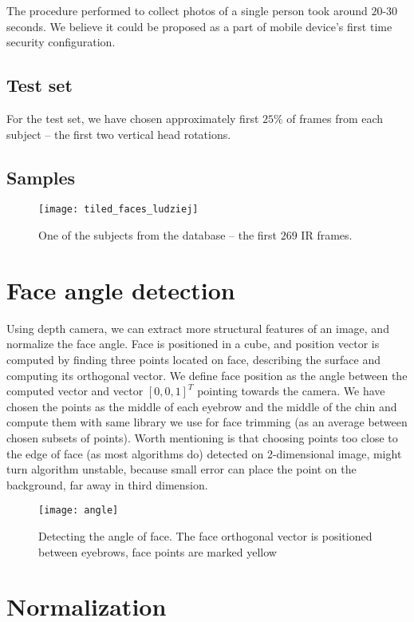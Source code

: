     The procedure performed to collect photos of a single person took around $20$-$30$ seconds.
    We believe it could be proposed as a part of mobile device's first time security configuration.

    \subsection*{Test set}
    For the test set, we have chosen approximately first $25\%$ of
    frames from each subject -- the first two vertical head rotations.
    \newpage

    \subsection*{Samples}
    \begin{figure}[H]
    \caption{One of the subjects from the database -- the first $269$ IR frames.}
    \centering
    \texttt{[image: tiled\_faces\_ludziej]}
    \end{figure}

    \section{Face angle detection}
    \label{sec:angledetection}
    Using depth camera, we can extract more structural features of an image,
    and normalize the face angle. Face is positioned in a cube, and position vector is computed
    by finding three points located on face, describing the surface
    and computing its orthogonal vector. We define face position
    as the angle between the computed vector and vector $[0,0,1]^T$ pointing towards the camera.
    We have chosen the points as the middle of each eyebrow and the middle of the chin and compute them with
    same library we use for face trimming (as an average between chosen subsets of points). Worth
    mentioning is that choosing points too close to the edge of face (as most algorithms do)
    detected on 2-dimensional image, might turn algorithm unstable, because small error can place the point on the background,
    far away in third dimension.


    \begin{figure}[H]
    \caption{Detecting the angle of face. The face orthogonal vector is positioned between eyebrows, face points are marked yellow}
    \centering
    \texttt{[image: angle]}
    \end{figure}


    \section{Normalization}
